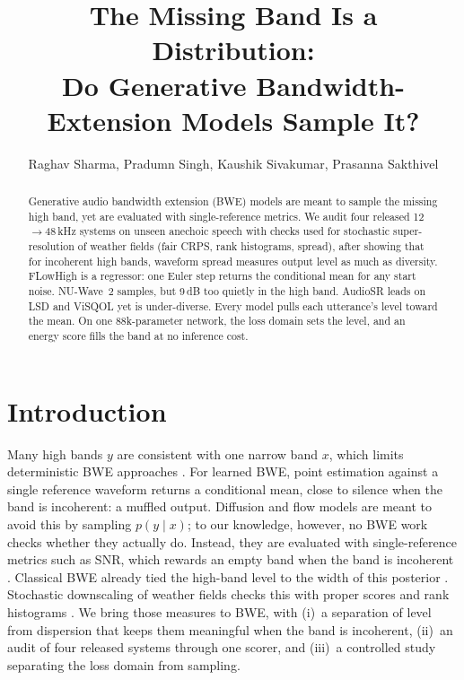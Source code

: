 \documentclass[letterpaper]{article} %
\title{The Missing Band Is a Distribution:\\Do Generative Bandwidth-Extension Models Sample It?}
\author{Raghav Sharma, Pradumn Singh, Kaushik Sivakumar, Prasanna Sakthivel}
\begin{document}
\maketitle

\begin{abstract}
Generative audio bandwidth extension (BWE) models are meant to sample the missing high band, yet are
evaluated with single-reference metrics. We audit four released 12$\to$48\,kHz systems on unseen anechoic
speech with checks used for stochastic super-resolution of weather fields (fair CRPS, rank histograms,
spread), after showing that for incoherent high bands, waveform spread measures output level as much as
diversity. FLowHigh is a regressor: one Euler step returns the conditional mean for any start noise.
NU-Wave~2 samples, but 9\,dB too quietly in the high band. AudioSR leads on LSD and ViSQOL yet is
under-diverse. Every model pulls each utterance's level toward the mean. On one 88k-parameter network, the
loss domain sets the level, and an energy score fills the band at no inference cost.
\end{abstract}

\begin{links}
\end{links}

\section{Introduction}
Many high bands $y$ are consistent with one narrow band $x$, which limits deterministic BWE approaches
\citep{jax2002,bruna2016}. For learned BWE, point estimation against a single reference waveform returns a
conditional mean, close to silence when the band is incoherent: a muffled output. Diffusion and flow models
\citep{han2022,liu2024,yun2025} are meant to avoid this by sampling $p(y\mid x)$; to our knowledge,
however, no BWE work checks whether they actually do. Instead, they are evaluated with single-reference
metrics such as SNR, which rewards an empty band when the band is incoherent \citep{su2021}. Classical BWE
already tied the high-band level to the width of this posterior \citep{nilsson2001}. Stochastic
downscaling of weather fields checks this with proper scores \citep{gneiting2007} and rank histograms
\citep{leinonen2021}. We bring those measures to BWE, with (i)~a separation of level from dispersion that
keeps them meaningful when the band is incoherent, (ii)~an audit of four released systems through one
scorer, and (iii)~a controlled study separating the loss domain from sampling.
\end{document}
